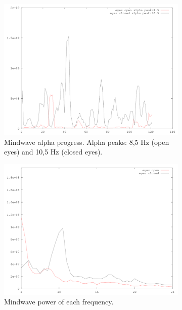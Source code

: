 \documentclass[a4paper,10pt,english,lof,lot,twoside]{puthesis}
\begin{document}
\begin{figure}
\begin{subfigure}[t]{0.49\linewidth}
\includegraphics[width=1.000\linewidth]{experiment-final-7-mindwave-alpha-progress.png}
\caption[EPOC alpha progress.]{Mindwave alpha progress. Alpha peaks: 8,5 Hz (open eyes) and 10,5 Hz (closed eyes).}\label{ch-experiment/index:fig-experiment-final-7-mindwave-alpha-progress}\end{subfigure}
\begin{subfigure}[t]{0.49\linewidth}
\centering
\capstart

\includegraphics[width=1.000\linewidth]{experiment-final-7-mindwave-pwelch-power.png}
\caption[Mindwave power of each frequency.]{Mindwave power of each frequency.}\label{ch-experiment/index:fig-experiment-final-7-mindwave-alpha-power}\end{subfigure}
\begin{subfigure}[t]{0.49\linewidth}
\centering
\capstart


\end{subfigure}
\end{figure}
\end{document}
